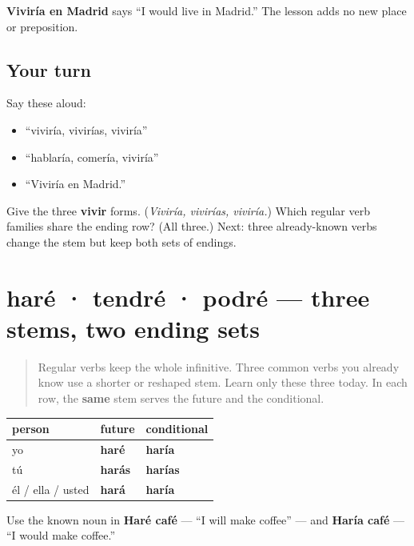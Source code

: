 \begin{grammarlens}[title={Grammar Lens: meaning with known words}]
\textbf{Viviría en Madrid} says “I would live in Madrid.” The lesson adds no new place or preposition.
\end{grammarlens}

\subsection*{Your turn}
Say these aloud:

\begin{itemize}
\raggedright
  \item “viviría, vivirías, viviría”
  \item “hablaría, comería, viviría”
  \item “Viviría en Madrid.”
\end{itemize}

\begin{tcolorbox}[breakable,colback=teal!4,colframe=teal!35!black,title={Before you move on}]
Give the three \textbf{vivir} forms. (\emph{Viviría, vivirías, viviría.}) Which regular verb families share the ending row? (All three.) Next: three already-known verbs change the stem but keep both sets of endings.
\end{tcolorbox}
\section[haré · tendré · podré]{haré · tendré · podré — three stems, two ending sets}

\label{lesson:ES-C17-irregulares}



\begin{quote}
Regular verbs keep the whole infinitive. Three common verbs you already know use a shorter or reshaped stem. Learn only these three today. In each row, the \textbf{same} stem serves the future and the conditional.
\end{quote}

\begin{grammarlens}[title={Grammar Lens: hacer becomes har-}]
\noindent
\begin{tabularx}{\linewidth}{@{}>{\raggedright\arraybackslash}X>{\raggedright\arraybackslash}X>{\raggedright\arraybackslash}X@{}}
\toprule
\textbf{person} & \textbf{future} & \textbf{conditional} \\
\midrule
yo & \textbf{haré} & \textbf{haría} \\
tú & \textbf{harás} & \textbf{harías} \\
él / ella / usted & \textbf{hará} & \textbf{haría} \\
\bottomrule
\end{tabularx}

Use the known noun in \textbf{Haré café} — “I will make coffee” — and \textbf{Haría café} — “I would make coffee.”
\end{grammarlens}

